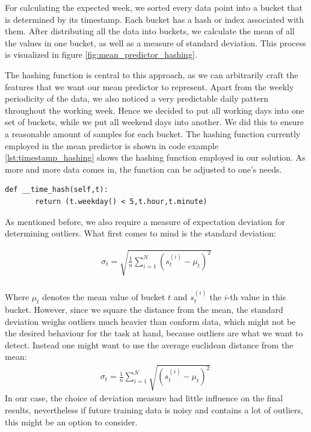 For calculating the expected week, we sorted every data point into a bucket that is determined by its timestamp. Each bucket has a hash or index associated with them. After distributing all the data into buckets, we calculate the mean of all the values in one bucket, as well as a measure of standard deviation. This process is visualized in figure \ref{fig:mean_predictor_hashing}.

The hashing function is central to this approach, as we can arbitrarily craft the features that we want our mean predictor to represent. Apart from the weekly periodicity of the data, we also noticed a very predictable daily pattern throughout the working week. Hence we decided to put all working days into one set of buckets, while we put all weekend days into another. We did this to ensure a reasonable amount of samples for each bucket. The hashing function currently employed in the mean predictor is shown in  code example \ref{lst:timestamp_hashing} shows the hashing function employed in our solution. As more and more data comes in, the function can be adjusted to one's needs.

\begin{minipage}{\linewidth}
\begin{lstlisting}[caption={Time stamp hashing function used for Mean Predictor},label={lst:timestamp_hashing}]
def __time_hash(self,t):
       return (t.weekday() < 5,t.hour,t.minute)

\end{lstlisting}
\end{minipage}

As mentioned before, we also require a measure of expectation deviation for determining outliers. What first comes to mind is the standard deviation:

\begin{equation}
\begin{aligned}
\sigma_t = \sqrt{\frac{1}{n}\sum_{i=1}^N (s_t^{(i)} - \mu_t)^2}\\
\end{aligned}
\end{equation}

Where $\mu_t$ denotes the mean value of bucket $t$ and $s_t^{(i)}$ the $i$-th value in this bucket. However, since we square the distance from the mean, the standard deviation weighs outliers much heavier than conform data, which might not be the desired behaviour for the task at hand, because outliers are what we want to detect. Instead one might want to use the average euclidean distance from the mean:
\begin{equation}
\begin{aligned}
\sigma_t = \frac{1}{n}\sum_{i=1}^N \sqrt{(s_t^{(i)} - \mu_t)^2}\
\end{aligned}
\end{equation}
In our case, the choice of deviation measure had little influence on the final results, nevertheless if future training data is noisy and contains a lot of outliers, this might be an option to consider. 

